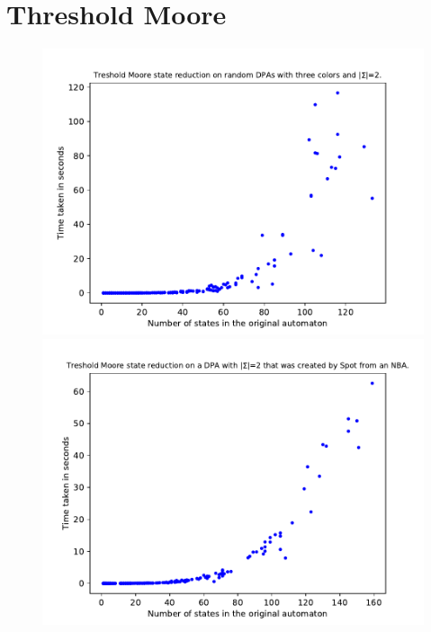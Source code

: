 \section{Threshold Moore}
\begin{figure}
	\centering
	\begin{minipage}{0.49\textwidth}
		\includegraphics[page=6,height=.3\textheight]{../data/analysis/threshold_moore/gendet_ap1.pdf} 
		\includegraphics[page=6,height=.3\textheight]{../data/analysis/threshold_moore/detspot_ap1.pdf} 

\end{minipage}
\end{figure}
